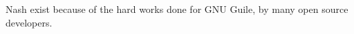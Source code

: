 \documentclass[preprint, 10pt]{sigplanconf}
\begin{document}

\acks{} Nash exist because of the hard works done for GNU Guile, by many open
source developers.







\end{document}
